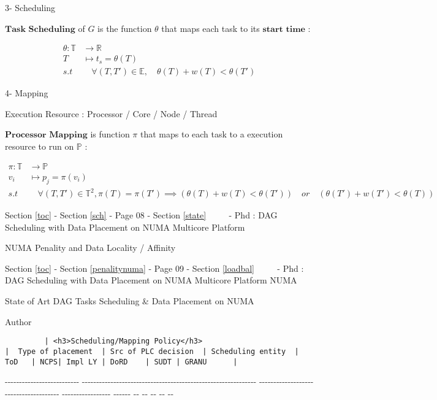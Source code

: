 \documentclass[11pt]{article}
\begin{document}
3- Scheduling

\(\textbf{Task Scheduling}\) of \(G\) is the function \(\theta\) that
maps each task to its \(\textbf{start time}\) :

\begin{align*}
  \theta \colon \mathbb{T} & \to \mathbb{R}\\
  T                    & \mapsto t_s = \theta(T)\\
  s.t & \quad \forall (T, T') \in \mathbb{E}, \quad \theta(T) + w(T) < \theta(T')
\end{align*}

4- Mapping

Execution Resource : Processor / Core / Node / Thread

\(\textbf{Processor Mapping}\) is function \(\pi\) that maps to each
task to a execution resource to run on \(\mathbb{P}\) :

\begin{align*}
  \pi \colon \mathbb{T} & \to \mathbb{P}\\
  v_i                    & \mapsto p_j = \pi(v_i)\\
  s.t & \quad \forall (T,T') \in \mathbb{T}^2, \pi(T) = \pi(T') \implies (\theta(T)+ w(T) < \theta(T')) \quad or \quad (\theta(T')+ w(T') < \theta(T))
\end{align*}

 

     {Section \ref{toc} - Section \ref{sch} - Page 08 - Section \ref{state}
~~~~ - Phd : DAG Scheduling with Data Placement on NUMA Multicore
Platform}

NUMA Penality and Data Locality / Affinity

 

     {Section \ref{toc} - Section \ref{penalitynuma} - Page 09 -
Section \ref{loadbal} ~~~~ - Phd : DAG Scheduling with Data Placement on
NUMA Multicore Platform} NUMA

State of Art DAG Tasks Scheduling \& Data Placement on NUMA

\textbar{}

Author

\begin{verbatim}
         | <h3>Scheduling/Mapping Policy</h3>                            |  Type of placement  | Src of PLC decision  | Scheduling entity  | ToD   | NCPS| Impl LY | DoRD    | SUDT | GRANU      |
\end{verbatim}

\textbar{}
-\/-\/-\/-\/-\/-\/-\/-\/-\/-\/-\/-\/-\/-\/-\/-\/-\/-\/-\/-\/-\/-\/-\/-\/-\/-
\textbar{}
-\/-\/-\/-\/-\/-\/-\/-\/-\/-\/-\/-\/-\/-\/-\/-\/-\/-\/-\/-\/-\/-\/-\/-\/-\/-\/-\/-\/-\/-\/-\/-\/-\/-\/-\/-\/-\/-\/-\/-\/-\/-\/-\/-\/-\/-\/-\/-\/-\/-\/-\/-\/-\/-\/-\/-\/-\/-\/-\/-\/-
\textbar{} -\/-\/-\/-\/-\/-\/-\/-\/-\/-\/-\/-\/-\/-\/-\/-\/-\/-\/-
\textbar{} -\/-\/-\/-\/-\/-\/-\/-\/-\/-\/-\/-\/-\/-\/-\/-\/-\/-\/-
\textbar{} -\/-\/-\/-\/-\/-\/-\/-\/-\/-\/-\/-\/-\/-\/-\/-\/- \textbar{}
-\/-\/-\/-\/-\/- \textbar{} -\/- \textbar{}-\/- \textbar{}-\/-
\textbar{}-\/- \textbar{}-\/- \textbar{} \textbar{}
\end{document}
